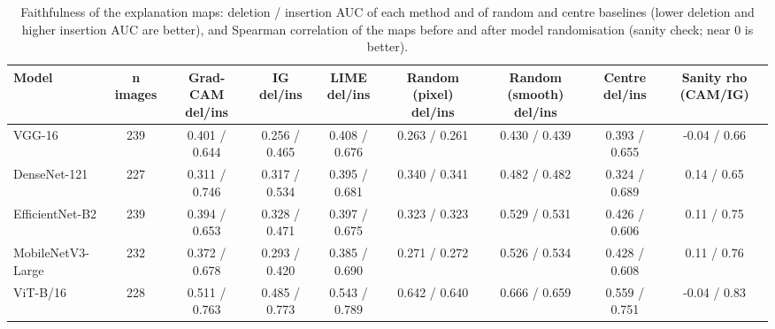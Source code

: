 \begin{table}[!tbp]
\centering
\caption{Faithfulness of the explanation maps: deletion / insertion AUC of each method and of random and centre baselines (lower deletion and higher insertion AUC are better), and Spearman correlation of the maps before and after model randomisation (sanity check; near 0 is better).}
\label{tab:xai}
\footnotesize
\begin{tabular}{lcccccccc}
\hline
Model & n images & Grad-CAM del/ins & IG del/ins & LIME del/ins & Random (pixel) del/ins & Random (smooth) del/ins & Centre del/ins & Sanity rho (CAM/IG) \\
\hline
VGG-16 & 239 & 0.401 / 0.644 & 0.256 / 0.465 & 0.408 / 0.676 & 0.263 / 0.261 & 0.430 / 0.439 & 0.393 / 0.655 & -0.04 / 0.66 \\
DenseNet-121 & 227 & 0.311 / 0.746 & 0.317 / 0.534 & 0.395 / 0.681 & 0.340 / 0.341 & 0.482 / 0.482 & 0.324 / 0.689 & 0.14 / 0.65 \\
EfficientNet-B2 & 239 & 0.394 / 0.653 & 0.328 / 0.471 & 0.397 / 0.675 & 0.323 / 0.323 & 0.529 / 0.531 & 0.426 / 0.606 & 0.11 / 0.75 \\
MobileNetV3-Large & 232 & 0.372 / 0.678 & 0.293 / 0.420 & 0.385 / 0.690 & 0.271 / 0.272 & 0.526 / 0.534 & 0.428 / 0.608 & 0.11 / 0.76 \\
ViT-B/16 & 228 & 0.511 / 0.763 & 0.485 / 0.773 & 0.543 / 0.789 & 0.642 / 0.640 & 0.666 / 0.659 & 0.559 / 0.751 & -0.04 / 0.83 \\
\hline
\end{tabular}
\end{table}